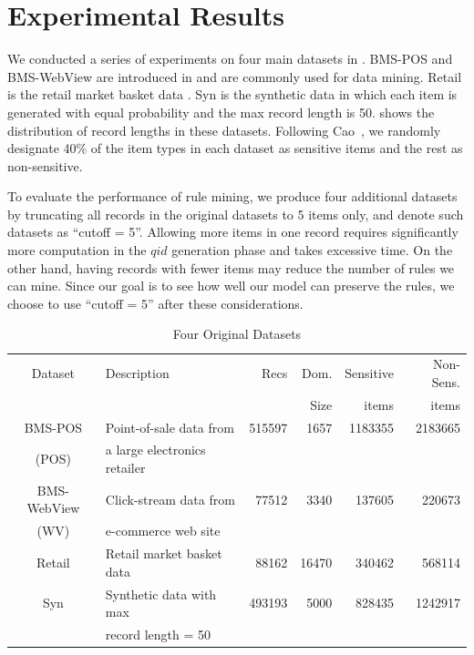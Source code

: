 \section{Experimental Results}
\label{sec:eval}


We conducted a series of experiments on
four main datasets in . BMS-POS and BMS-WebView are
introduced in \cite{Zheng:2001:RWP:502512.502572} and are commonly used for data mining. Retail is the retail market basket data \cite{brijs99:retailData}. Syn is the synthetic data in which each item is generated with equal probability and the max record length is 50.
 shows the distribution of record lengths in these datasets.
Following Cao~\cite{Cao:2010:rho}, we randomly designate 
40\% of the item types in each dataset as sensitive items and 
the rest as non-sensitive.

To evaluate the performance of rule mining,
we produce four additional datasets by truncating all records in the
original datasets to 5 items only, and denote
such datasets as ``cutoff = 5''.
Allowing more items in one record requires significantly more computation in the $qid$
generation phase and takes excessive time. On the other hand,
having records with fewer items may reduce the number of rules we can mine.
Since our goal is to see how well our model can preserve the rules,
we choose to use ``cutoff = 5'' after these considerations.

\begin{table}[tb]
\centering
\caption{Four Original Datasets\label{tab:datasets}}{
\begin{tabular}{|c|l|r|r|r|r|} \hline
Dataset	& Description & Recs & Dom. & Sensitive & Non-Sens.\\
& & & Size & items & items  \\ \hline \hline
BMS-POS &Point-of-sale data from &515597 & 1657&1183355 &  2183665\\
(POS)	& a large electronics retailer   &	&	&	& \\ \hline
BMS-WebView &Click-stream data from &77512 & 3340& 137605 & 220673  \\
(WV) & e-commerce web site  & &  & & \\ \hline
Retail &  Retail market basket data   & 88162&16470 &340462 & 568114  \\ \hline
Syn & Synthetic data with max & 493193 &5000 &828435 & 1242917 \\
 & record length = 50   & & & & \\ \hline
\end{tabular}
}
\end{table}

